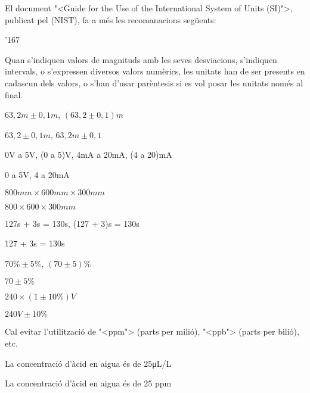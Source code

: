 El document  {"<}Guide for the Use of the International System of Units (SI){">}, publicat pel (\textsf{NIST}),  fa a m\'{e}s les recomanacions seg\"{u}ents:

\begin{dinglist}{'167}

\item Quan s'indiquen valors de magnituds amb les seves desviacions,
s'indiquen intervals, o s'expressen diversos valors num\`{e}rics, les
unitats han de ser presents en cadascun dels valors, o s'han d'usar
par\`{e}ntesis si es vol posar les unitats nom\'{e}s al final.

\textcolor{Green}{} $63{,}2\unit{m} \pm 0{,}1\unit{m}$, $(63{,}2 \pm 0{,}1)\unit{m}$

\textcolor{Red}{} $63{,}2 \pm 0{,}1\unit{m}$, $63{,}2\unit{m} \pm 0{,}1$

\textcolor{Green}{} 0\unit{V} a 5\unit{V}, (0 a 5)\unit{V}, 4\unit{mA} a 20\unit{mA}, (4 a 20)\unit{mA}

\textcolor{Red}{} 0 a 5\unit{V},  4 a 20\unit{mA}

\textcolor{Green}{} $800\unit{mm}\times 600\unit{mm}\times 300\unit{mm}$

\textcolor{Red}{} $800\times 600\times 300\unit{mm}$

\textcolor{Green}{} 127\unit{s} + 3\unit{s} = 130\unit{s}, (127 + 3)\unit{s} = 130\unit{s}

\textcolor{Red}{}  127 + 3\unit{s} = 130\unit{s}

\textcolor{Green}{} $70\unit{\%} \pm 5\unit{\%}$, $(70 \pm 5)\unit{\%}$

\textcolor{Red}{}  $70 \pm 5\unit{\%}$

\textcolor{Green}{} $240 \times (1 \pm 10\unit{\%})\unit{V}$

\textcolor{Red}{}  $240\unit{V} \pm 10\unit{\%}$

\item Cal evitar l'utilitzaci\'{o} de {"<}ppm{">} (parts per mili\'{o}), {"<}ppb{">} (parts per bili\'{o}), etc.

\textcolor{Green}{} La concentraci\'{o} d'\`{a}cid en aigua \'{e}s de 25\unit{\micro L/L}

\textcolor{Red}{} La concentraci\'{o} d'\`{a}cid en aigua \'{e}s de 25 ppm

\end{dinglist}
